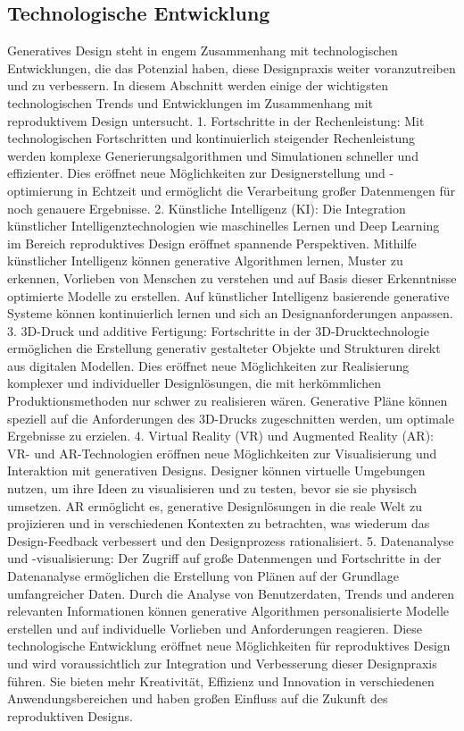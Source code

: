  \subsection*{Technologische Entwicklung}
 Generatives Design steht in engem Zusammenhang mit technologischen Entwicklungen, die das Potenzial haben, diese Designpraxis weiter voranzutreiben und zu verbessern. In diesem Abschnitt werden einige der wichtigsten technologischen Trends und Entwicklungen im Zusammenhang mit reproduktivem Design untersucht. 
 1. Fortschritte in der Rechenleistung: Mit  technologischen Fortschritten und kontinuierlich steigender Rechenleistung werden komplexe Generierungsalgorithmen und Simulationen schneller und effizienter. Dies eröffnet neue Möglichkeiten zur Designerstellung und -optimierung in Echtzeit und ermöglicht die Verarbeitung großer Datenmengen für noch genauere Ergebnisse.  2. Künstliche Intelligenz (KI): Die Integration künstlicher Intelligenztechnologien wie maschinelles Lernen und Deep Learning im Bereich reproduktives Design eröffnet spannende Perspektiven. Mithilfe künstlicher Intelligenz können generative Algorithmen lernen, Muster zu erkennen, Vorlieben von Menschen zu verstehen und auf Basis dieser Erkenntnisse optimierte Modelle zu erstellen. Auf künstlicher Intelligenz basierende generative Systeme können kontinuierlich lernen und sich an Designanforderungen anpassen. 
 3. 3D-Druck und additive Fertigung: Fortschritte in der 3D-Drucktechnologie ermöglichen die Erstellung generativ gestalteter Objekte und Strukturen direkt aus digitalen Modellen. Dies eröffnet neue Möglichkeiten zur Realisierung komplexer und individueller Designlösungen, die mit herkömmlichen Produktionsmethoden nur schwer zu realisieren wären. Generative Pläne können speziell auf die Anforderungen des 3D-Drucks zugeschnitten werden, um optimale Ergebnisse zu erzielen.  
 4. Virtual Reality (VR) und Augmented Reality (AR): VR- und AR-Technologien eröffnen neue Möglichkeiten zur Visualisierung und Interaktion mit generativen Designs. Designer können virtuelle Umgebungen nutzen, um ihre Ideen zu visualisieren und zu testen,  bevor sie sie physisch umsetzen. AR ermöglicht es, generative Designlösungen in die reale Welt zu projizieren und  in verschiedenen Kontexten zu betrachten, was wiederum das Design-Feedback verbessert und den Designprozess rationalisiert. 
 5. Datenanalyse und -visualisierung: Der Zugriff auf große Datenmengen und  Fortschritte in der Datenanalyse ermöglichen die Erstellung von Plänen auf der Grundlage umfangreicher Daten. Durch die Analyse von Benutzerdaten, Trends und anderen relevanten Informationen können generative Algorithmen personalisierte Modelle erstellen und auf individuelle Vorlieben und Anforderungen reagieren.  Diese technologische Entwicklung eröffnet neue Möglichkeiten für reproduktives Design und wird voraussichtlich zur Integration und Verbesserung dieser Designpraxis führen. Sie bieten mehr Kreativität, Effizienz und Innovation in verschiedenen Anwendungsbereichen und haben großen Einfluss auf die Zukunft des reproduktiven Designs.

